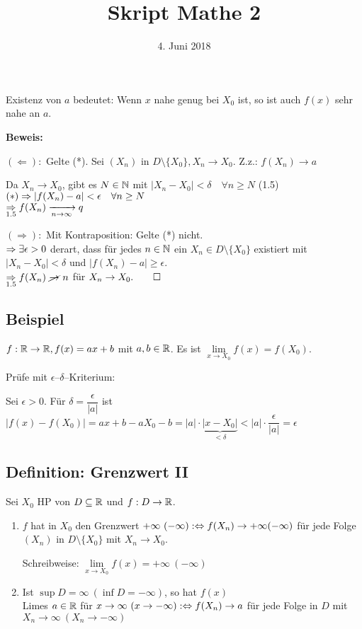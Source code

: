 \documentclass[10pt, a4paper, fleqn]{article}
\begin{document}
    \title{Skript Mathe 2}
    \date{4. Juni 2018}
    \maketitle
\fi

Existenz von $a$ bedeutet: Wenn $x$ nahe genug bei $X_0$ ist, so ist auch $f(x)$ sehr
nahe an $a$.

\textbf{Beweis: } %

$(\Leftarrow):$ Gelte (*). Sei $(X_n)$ in $D \setminus \{X_0\}, X_n \to X_0.$
Z.z.: $f(X_n) \to a$

Da $X_n \to X_0$, gibt es $N \in \mathbb{N}$ mit $|X_n - X_0| < \delta \quad \forall n \geq N$ (1.5) \\
$(*) \Rightarrow |f(X_n) - a| < \epsilon \quad \forall n \geq N$ \\
$\underset{1.5}{\Rightarrow} f(X_n) \xrightarrow[n \to \infty]{} q$

$(\Rightarrow):$ Mit Kontraposition: Gelte (*) nicht. \\
$\Rightarrow \exists \epsilon > 0$ derart, dass für jedes $n \in \mathbb{N}$ ein $X_n \in D \setminus \{X_0\}$
existiert mit \\
$|X_n - X_0| < \delta$ und $|f(X_n) - a| \geq \epsilon$. \\
$\underset{1.5}{\imp} f(X_n) \ \cancel{\to} \ n$ für $X_n \to X_0. \qed$

\subsection{Beispiel}
$f: \mathbb{R} \to \mathbb{R}, f(x) = ax + b$ mit $a, b \in \mathbb{R}$. Es ist $\lim\limits_{x \to X_0} f(x) = f(X_0).$

Prüfe mit $\epsilon$--$\delta$--Kriterium:

Sei $\epsilon > 0$. Für $\delta = \dfrac{\epsilon}{|a|}$ ist \\
$|f(x) - f(X_0)| = ax + b - aX_0 - b = |a| \cdot \underbrace{|x - X_0|}_{< \delta} < |a| \cdot \dfrac{\epsilon}{|a|} = \epsilon$

\subsection{Definition: Grenzwert II}
Sei $X_0$ HP von $D \subseteq \mathbb{R}$ und $f: D \to \mathbb{R}$.
\begin{enumerate}[1.]
    \item $f$ hat in $X_0$ den Grenzwert $+\infty \ (-\infty) :\Leftrightarrow f(X_n) \to +\infty (-\infty)$ für
    jede Folge $(X_n)$ in $D \setminus \{X_0\}$ mit $X_n \to X_0$.

    Schreibweise: $\lim\limits_{x \to X_0} f(x) = +\infty \ (-\infty)$

    \item Ist $\sup D = \infty \ (\inf D = -\infty)$, so hat $f(x)$ \\
    Limes $a \in \mathbb{R}$ für $x \to \infty \ (x \to -\infty) :\Leftrightarrow f(X_n) \to a$ für jede Folge
    in $D$ mit $X_n \to \infty \ (X_n \to -\infty)$
\end{enumerate}
\end{document}
